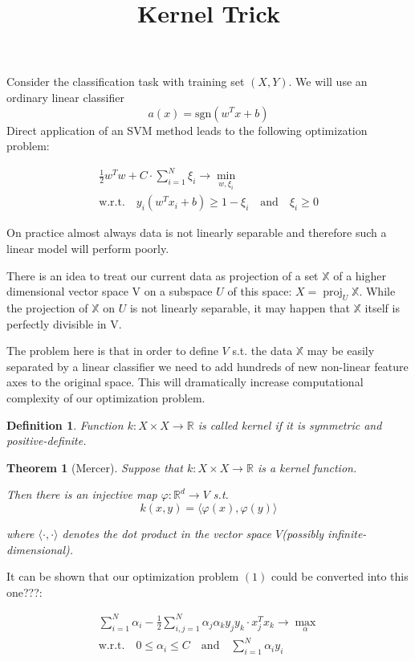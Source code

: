 \documentclass{article}
\DeclareMathOperator{\proj}{proj}
\theoremstyle{bfnote}
\newtheorem{defi}{Definition}
\newtheorem{thm}{Theorem}
\begin{document}
	\title{Kernel Trick}
	Consider the classification task with training set $(X, Y)$. 
	We will use an ordinary linear classifier $$a(x)=\text{sgn}(w^T x + b)$$ Direct application of an SVM method leads to the following optimization problem:
	
	\begin{gather}
	\frac{1}{2} w^T w + C \cdot \sum_{i=1}^N {\xi_i} \rightarrow \min\limits_{w, \xi_i} \\
	\text{w.r.t.} \quad y_i(w^T x_i + b) \ge 1-\xi_i \quad \text{and} \quad \xi_i \ge 0 
	\end{gather}
	
	On practice almost always data is not linearly separable and therefore such a linear model will perform poorly.
	
	There is an idea to treat our current data as projection of a set $\mathbb{X}$ of a higher dimensional vector space V on a subspace $U$ of this space: $X=\proj_U \mathbb{X}$. While the projection of $\mathbb{X}$ on $U$ is not linearly separable, it may happen that $\mathbb{X}$ itself is perfectly divisible in V.
	
	The problem here is that in order to define $V$ s.t. the data $\mathbb{X}$ may be easily separated by a linear classifier
	we need to add hundreds of new non-linear feature axes to the original space. This will dramatically increase computational complexity of our optimization problem.
	
	\begin{defi}
	Function $k: X \times X \rightarrow \mathbb{R}$ is called kernel if it is symmetric and positive-definite.
	\end{defi}
	
	\begin{thm}[Mercer]
		
		Suppose that $k: X \times X \rightarrow \mathbb{R}$ is a kernel function.

		Then there is an injective map $\varphi: \mathbb{R}^d \rightarrow V$ s.t. 
		$$k(x, y) = \langle \varphi(x), \varphi(y) \rangle$$ 
		
		where $\langle \cdot , \cdot \rangle$ denotes the dot product in the vector space $V$(possibly infinite-dimensional).
		
	\end{thm}	

	
	It can be shown that our optimization problem $(1)$ could be converted into this one???:
	
	\begin{gather}
	\sum_{i=1}^N {\alpha_i} - \frac{1}{2}\sum_{i,j=1}^N \alpha_j \alpha_k y_j y_k \cdot x_j^T x_k
	\rightarrow \max\limits_{\alpha} \\
	\text{w.r.t.} \quad 0 \le \alpha_i \le C \quad \text{and} \quad \sum_{i=1}^N \alpha_i y_i
	\end{gather}
	
\end{document}

